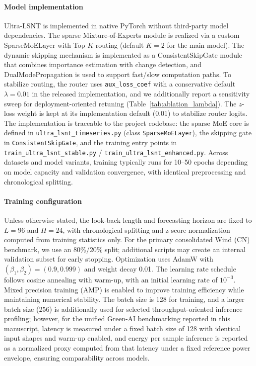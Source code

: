 \documentclass[review,3p,times]{elsarticle}
\begin{document}
\paragraph{Model implementation}
Ultra-LSNT is implemented in native PyTorch without third-party model dependencies. The sparse Mixture-of-Experts module is realized via a custom SparseMoELayer with Top-$K$ routing (default $K=2$ for the main model). The dynamic skipping mechanism is implemented as a ConsistentSkipGate module that combines importance estimation with change detection, and DualModePropagation is used to support fast/slow computation paths. To stabilize routing, the router uses \texttt{aux\_loss\_coef} with a conservative default $\lambda=0.01$ in the released implementation, and we additionally report a sensitivity sweep for deployment-oriented retuning (Table~\ref{tab:ablation_lambda}). The $z$-loss weight is kept at its implementation default (0.01) to stabilize router logits. The implementation is traceable to the project codebase: the sparse MoE core is defined in \texttt{ultra\_lsnt\_timeseries.py} (class \texttt{SparseMoELayer}), the skipping gate in \texttt{ConsistentSkipGate}, and the training entry points in \texttt{train\_ultra\_lsnt\_stable.py} / \texttt{train\_ultra\_lsnt\_enhanced.py}. Across datasets and model variants, training typically runs for 10--50 epochs depending on model capacity and validation convergence, with identical preprocessing and chronological splitting.

\paragraph{Training configuration}
Unless otherwise stated, the look-back length and forecasting horizon are fixed to $L=96$ and $H=24$, with chronological splitting and z-score normalization computed from training statistics only. For the primary consolidated Wind (CN) benchmark, we use an 80\%/20\% split; additional scripts may create an internal validation subset for early stopping. Optimization uses AdamW with $(\beta_1,\beta_2)=(0.9,0.999)$ and weight decay 0.01. The learning rate schedule follows cosine annealing with warm-up, with an initial learning rate of $10^{-3}$. Mixed precision training (AMP) is enabled to improve training efficiency while maintaining numerical stability. The batch size is 128 for training, and a larger batch size (256) is additionally used for selected throughput-oriented inference profiling; however, for the unified Green-AI benchmarking reported in this manuscript, latency is measured under a fixed batch size of 128 with identical input shapes and warm-up enabled, and energy per sample inference is reported as a normalized proxy computed from that latency under a fixed reference power envelope, ensuring comparability across models.
\end{document}

